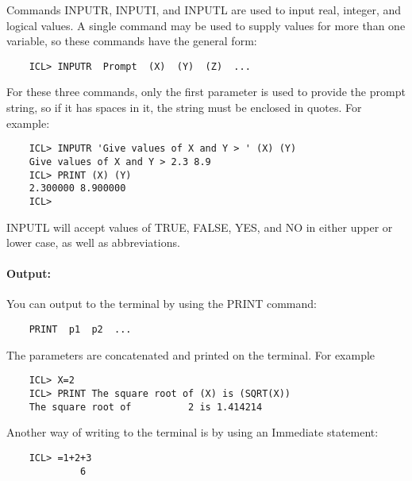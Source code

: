 Commands INPUTR, INPUTI, and INPUTL are used to input real, integer, and logical
values.
A single command may be used to supply values for more than one variable, so
these commands have the general form:

\begin{small}
\begin{verbatim}
    ICL> INPUTR  Prompt  (X)  (Y)  (Z)  ...
\end{verbatim}
\end{small}

For these three commands, only the first parameter is used to provide the
prompt string, so if it has spaces in it, the string must be enclosed in quotes.
For example:

\begin{small}
\begin{verbatim}
    ICL> INPUTR 'Give values of X and Y > ' (X) (Y)
    Give values of X and Y > 2.3 8.9
    ICL> PRINT (X) (Y)
    2.300000 8.900000
    ICL>
\end{verbatim}
\end{small}

INPUTL will accept values of TRUE, FALSE, YES, and NO in either upper or
lower case, as well as abbreviations.

\paragraph{Output:}\hfill

You can output to the terminal by using the PRINT command:

\begin{small}
\begin{verbatim}
    PRINT  p1  p2  ...
\end{verbatim}
\end{small}

The parameters are concatenated and printed on the terminal.
For example

\begin{small}
\begin{verbatim}
    ICL> X=2
    ICL> PRINT The square root of (X) is (SQRT(X))
    The square root of          2 is 1.414214
\end{verbatim}
\end{small}

Another way of writing to the terminal is by using an Immediate statement:

\begin{small}
\begin{verbatim}
    ICL> =1+2+3
             6
\end{verbatim}
\end{small}


